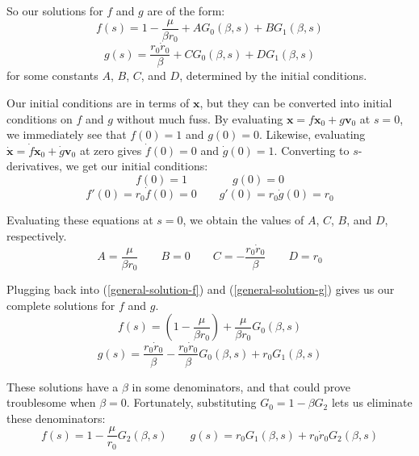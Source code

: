 \documentclass{article}
\numberwithin{equation}{subsection}
\begin{document}
So our solutions for $f$ and $g$ are of the form:
\begin{equation}
\label{general-solution-f}
f(s) = 1 - \frac{\mu}{\beta r_0} + A G_0(\beta, s) + B G_1(\beta, s)
\end{equation}
\begin{equation}
\label{general-solution-g}
g(s) = \frac{r_0 \dot{r}_0}{\beta} + C G_0(\beta, s) + D G_1(\beta, s)
\end{equation}
for some constants $A$, $B$, $C$, and $D$, determined by the initial conditions.

Our initial conditions are in terms of $\bm x$, but they can be converted into initial conditions on $f$ and $g$ without much fuss. By evaluating $\bm x = f \bm x_0 + g \bm v_0$ at $s = 0$, we immediately see that $f(0) = 1$ and $g(0) = 0$. Likewise, evaluating $\dot{\bm x} = \dot{f} \bm x_0 + \dot{g} \bm v_0$ at zero gives $\dot f(0) = 0$ and $\dot g(0) = 1$. Converting to $s$-derivatives, we get our initial conditions:
\begin{equation}
f(0) = 1 \qquad\qquad g(0) = 0
\end{equation}
\begin{equation*}
f'(0) = r_0 \dot{f}(0) = 0 \qquad g'(0) = r_0 \dot{g}(0) = r_0
\end{equation*}

Evaluating these equations at $s = 0$, we obtain the values of $A$, $C$, $B$, and $D$, respectively.
\begin{equation}
A = \frac{\mu}{\beta r_0} \qquad B = 0 \qquad C = -\frac{r_0 \dot{r}_0}{\beta} \qquad D = r_0
\end{equation}

Plugging back into (\ref{general-solution-f}) and (\ref{general-solution-g}) gives us our complete solutions for $f$ and $g$.
\begin{equation}
f(s) = \left( 1 - \frac{\mu}{\beta r_0} \right) + \frac{\mu}{\beta r_0} G_0(\beta, s)
\end{equation}
\begin{equation}
g(s) = \frac{r_0 \dot{r}_0}{\beta} - \frac{r_0 \dot{r}_0}{\beta} G_0(\beta, s) + r_0 G_1(\beta, s)
\end{equation}

These solutions have a $\beta$ in some denominators, and that could prove troublesome when $\beta = 0$.
Fortunately, substituting $G_0 = 1 - \beta G_2$ lets us eliminate these denominators:
\begin{equation}
\label{solution-for-position}
f(s) = 1 - \frac{\mu}{r_0} G_2(\beta, s)
\qquad
g(s) = r_0 G_1(\beta, s) + r_0 \dot{r}_0 G_2(\beta, s)
\end{equation}
\end{document}

